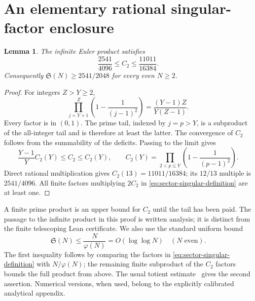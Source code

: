 \documentclass[11pt,a4paper]{article}
\newtheorem{lemma}[theorem]{Lemma}
\theoremstyle{definition}
\theoremstyle{remark}
\begin{document}
\section{An elementary rational singular-factor enclosure}
\label{sec:sector-rational-singular}

\begin{lemma}
\label{lem:sector-C2-rational}
The infinite Euler product satisfies
\[
 \frac{2541}{4096}\leq C_2\leq\frac{11011}{16384}.
\]
Consequently $\mathfrak S(N)\geq2541/2048$ for every even $N\geq2$.
\end{lemma}
\begin{proof}
For integers $Z>Y\geq2$,
\[
 \prod_{j=Y+1}^Z\left(1-\frac1{(j-1)^2}\right)
                  =\frac{(Y-1)Z}{Y(Z-1)}.
\]
Every factor is in $(0,1)$.  The prime tail, indexed by $j=p>Y$,
is a subproduct of the all-integer tail and is therefore at least
the latter.  The convergence of $C_2$ follows from the summability
of the deficits.  Passing to the limit gives
\[
 \frac{Y-1}{Y}C_2(Y)\leq C_2\leq C_2(Y),\qquad
 C_2(Y)=\prod_{2<p\leq Y}\left(1-\frac1{(p-1)^2}\right).
\]
Direct rational multiplication gives $C_2(13)=11011/16384$; its
$12/13$ multiple is $2541/4096$.  All finite factors multiplying
$2C_2$ in \eqref{eq:sector-singular-definition} are at least one.
\end{proof}

A finite prime product is an upper bound for $C_2$ until the tail has
been paid.  The passage to the infinite product in this proof is
written analysis; it is distinct from the finite telescoping Lean
certificate.  We also use the standard uniform bound
\begin{equation}
 \mathfrak S(N)\leq \frac{N}{\varphi(N)}=O(\log\log N)
 \quad(N\text{ even}).
 \label{eq:sector-S-upper}
\end{equation}
The first inequality follows by comparing the factors in
\eqref{eq:sector-singular-definition} with $N/\varphi(N)$; the
remaining finite subproduct of the $C_2$ factors bounds the full
product from above.  The usual totient estimate~\cite[Theorem 15]{RS} gives the second
assertion.  Numerical versions, when used, belong to the explicitly
calibrated analytical appendix.
\end{document}
